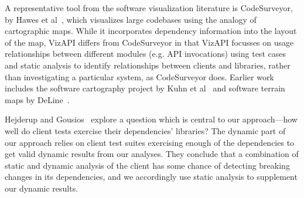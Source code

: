 \label{sec:related-work}
A representative tool from the software visualization literature is
CodeSurveyor, by Hawes et al~\cite{hawes15:_codes}, which visualizes large
codebases using the analogy of cartographic maps. While it
incorporates dependency information into the layout of the map, VizAPI
differs from CodeSurveyor in that VizAPI focusses on usage relationships
between different modules (e.g. API invocations) using test
cases and static analysis to identify relationships between clients and libraries, rather
than investigating a particular system, as CodeSurveyor does.  Earlier
work includes the software cartography project by Kuhn et
al~\cite{kuhn10:_softw} and software terrain maps by DeLine~\cite{deline05:_stayin}.




Hejderup and Gousios~\cite{DBLP:journals/jss/HejderupG22} explore a
question which is central to our approach---how well do client tests
exercise their dependencies' libraries? The dynamic part of our approach relies on
client test suites exercising enough of the dependencies to get valid
dynamic results from our analyses. They conclude that a combination of
static and dynamic analysis of the client has some chance of detecting
breaking changes in its dependencies, and we accordingly use static
analysis to supplement our dynamic results.


